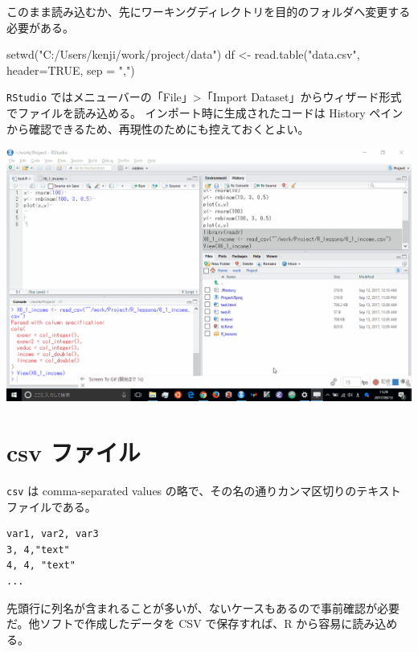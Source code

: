 \documentclass[
  letterpaper,
  xelatex,
  ja=standard, xelatex]{bxjsbook}
\newenvironment{Shaded}{\begin{snugshade}}{\end{snugshade}}
\newcommand{\AttributeTok}[1]{\textcolor[rgb]{0.40,0.45,0.13}{#1}}
\newcommand{\ConstantTok}[1]{\textcolor[rgb]{0.56,0.35,0.01}{#1}}
\newcommand{\FunctionTok}[1]{\textcolor[rgb]{0.28,0.35,0.67}{#1}}
\newcommand{\NormalTok}[1]{\textcolor[rgb]{0.00,0.23,0.31}{#1}}
\newcommand{\OtherTok}[1]{\textcolor[rgb]{0.00,0.23,0.31}{#1}}
\newcommand{\StringTok}[1]{\textcolor[rgb]{0.13,0.47,0.30}{#1}}
\begin{document}
このまま読み込むか、先にワーキングディレクトリを目的のフォルダへ変更する必要がある。

\begin{Shaded}
\begin{Highlighting}[]
\FunctionTok{setwd}\NormalTok{(}\StringTok{"C:/Users/kenji/work/project/data"}\NormalTok{)}
\NormalTok{df }\OtherTok{\textless{}{-}} \FunctionTok{read.table}\NormalTok{(}\StringTok{"data.csv"}\NormalTok{, }\AttributeTok{header=}\ConstantTok{TRUE}\NormalTok{, }\AttributeTok{sep =} \StringTok{","}\NormalTok{)}
\end{Highlighting}
\end{Shaded}

\texttt{RStudio} ではメニューバーの「File」\textgreater「Import
Dataset」からウィザード形式でファイルを読み込める。
インポート時に生成されたコードは History
ペインから確認できるため、再現性のためにも控えておくとよい。

\includegraphics{figs/rstudio_input.gif}

\section{csv ファイル}\label{csv-ux30d5ux30a1ux30a4ux30eb}

\texttt{csv} は comma-separated values
の略で、その名の通りカンマ区切りのテキストファイルである。

\begin{verbatim}
var1, var2, var3
3, 4,"text"
4, 4, "text"
...
\end{verbatim}

先頭行に列名が含まれることが多いが、ないケースもあるので事前確認が必要だ。他ソフトで作成したデータを
CSV で保存すれば、R から容易に読み込める。
\end{document}
